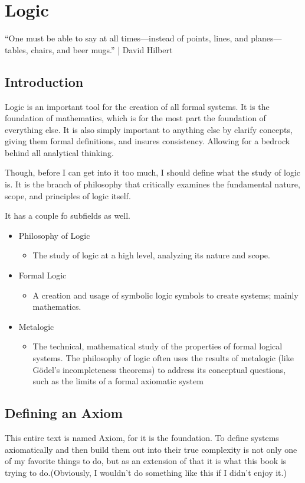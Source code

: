 \chapter{Logic}
“One must be able to say at all times—instead of points, lines, and planes—tables, chairs, and beer mugs.” | David Hilbert
\singlespacing
\section{Introduction}
Logic is an important tool for the creation of all formal systems. It is the foundation of mathematics, which is for the most part the foundation of everything else. It is also simply important to anything else by clarify concepts, giving them formal definitions, and insures consistency. Allowing for a bedrock behind all analytical thinking. 

Though, before I can get into it too much, I should define what the study of logic is. It is the branch of philosophy that critically examines the fundamental nature, scope, and principles of logic itself.

It has a couple fo subfields as well. 
\begin{itemize}
    \item Philosophy of Logic
    \begin{itemize}
        \item The study of logic at a high level, analyzing its nature and scope.
    \end{itemize}
    \item Formal Logic
    \begin{itemize}
        \item A creation and usage of symbolic logic symbols to create systems; mainly mathematics.
    \end{itemize}
    \item Metalogic
    \begin{itemize}
        \item The technical, mathematical study of the properties of formal logical systems. The philosophy of logic often uses the results of metalogic (like Gödel's incompleteness theorems) to address its conceptual questions, such as the limits of a formal axiomatic system
    \end{itemize}
\end{itemize}
\section{Defining an Axiom}
This entire text is named Axiom, for it is the foundation. To define systems axiomatically and then build them out into their true complexity is not only one of my favorite things to do, but as an extension of that it is what this book is trying to do.(Obviously, I wouldn't do something like this if I didn't enjoy it.)

